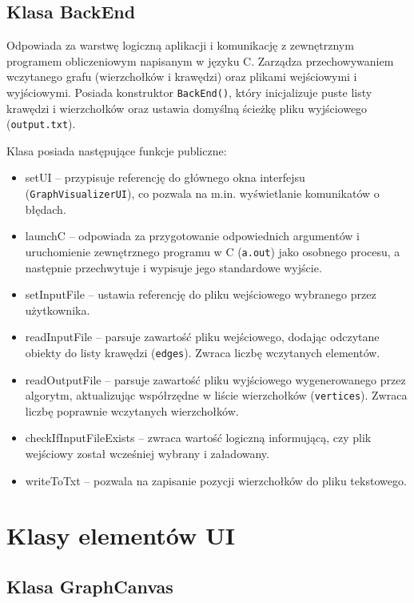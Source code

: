 \documentclass[]{article}
\begin{document}
    \subsection{Klasa BackEnd}
    Odpowiada za warstwę logiczną aplikacji i komunikację z zewnętrznym programem obliczeniowym napisanym w języku C. Zarządza przechowywaniem wczytanego grafu (wierzchołków i krawędzi) oraz plikami wejściowymi i wyjściowymi.
    Posiada konstruktor \texttt{BackEnd()}, który inicjalizuje puste listy krawędzi i wierzchołków oraz ustawia domyślną ścieżkę pliku wyjściowego (\texttt{output.txt}).
    
    Klasa posiada następujące funkcje publiczne:
    \begin{itemize}
        \item setUI -- przypisuje referencję do głównego okna interfejsu (\texttt{GraphVisualizerUI}), co pozwala na m.in. wyświetlanie komunikatów o błędach.
        \item launchC -- odpowiada za przygotowanie odpowiednich argumentów i uruchomienie zewnętrznego programu w C (\texttt{a.out}) jako osobnego procesu, a następnie przechwytuje i wypisuje jego standardowe wyjście.
        \item setInputFile -- ustawia referencję do pliku wejściowego wybranego przez użytkownika.
        \item readInputFile -- parsuje zawartość pliku wejściowego, dodając odczytane obiekty do listy krawędzi (\texttt{edges}). Zwraca liczbę wczytanych elementów.
        \item readOutputFile -- parsuje zawartość pliku wyjściowego wygenerowanego przez algorytm, aktualizując współrzędne w liście wierzchołków (\texttt{vertices}). Zwraca liczbę poprawnie wczytanych wierzchołków.
        \item checkIfInputFileExists -- zwraca wartość logiczną informującą, czy plik wejściowy został wcześniej wybrany i załadowany.
        \item writeToTxt -- pozwala na zapisanie pozycji wierzchołków do pliku tekstowego.
    \end{itemize}

    \section{Klasy elementów UI}

    \subsection{Klasa GraphCanvas}
\end{document}
